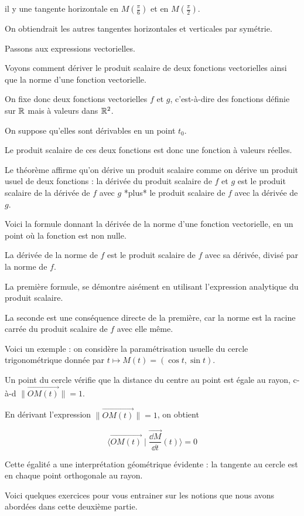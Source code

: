 \change
il y une tangente horizontale en $M(\frac\pi6)$ 
et en $M(\frac\pi2)$.

On obtiendrait les autres tangentes horizontales et verticales par symétrie.


\diapo

Passons aux expressions vectorielles.

Voyons comment dériver le produit scalaire de deux fonctions vectorielles ainsi
que la norme d'une fonction vectorielle.

On fixe donc deux fonctions vectorielles $f$ et $g$, c'est-à-dire des fonctions définie sur $\mathbb{R}$
mais à valeurs dans $\mathbb{R}^2$.

On suppose qu'elles sont dérivables en un point $t_0$.

\change

Le produit scalaire de ces deux fonctions est donc une fonction à valeurs 
réelles.

Le théorème affirme qu'on dérive un produit scalaire 
comme on dérive un produit usuel de deux fonctions : 
la dérivée du produit scalaire de $f$ et $g$ est le 
produit scalaire de la dérivée de $f$ avec  $g$ *plus* le produit 
scalaire de $f$ avec la dérivée de $g$. 

\change

Voici la formule donnant la dérivée de la norme d'une fonction vectorielle, 
en un point où la fonction est non nulle.

La dérivée de la norme de $f$ est le produit scalaire de $f$ avec 
sa dérivée, divisé par la norme de $f$.


La première formule, se démontre aisément 
en utilisant l'expression analytique du produit scalaire.

La seconde  est une conséquence directe de la première, 
car la norme est la racine carrée du produit scalaire de $f$ avec 
elle même.

\diapo

Voici un exemple : on considère la paramétrisation usuelle 
du cercle trigonométrique donnée par $t\mapsto M(t)=(\cos t,\sin t)$. 

\change
Un point du cercle vérifie que la distance du centre au point est égale au rayon,
c-à-d $\|\overrightarrow{OM(t)}\|=1$.

\change

En dérivant l'expression $\|\overrightarrow{OM(t)}\|=1$, on obtient

$$\big\langle \overrightarrow{OM(t)} \mid \overrightarrow{\frac{\dd M}{\dd t}}(t) \big\rangle =0$$


\change

Cette égalité a une interprétation géométrique évidente : 
la tangente au cercle est en chaque point orthogonale au rayon.

\diapo

Voici quelques exercices pour vous entrainer sur les notions que nous avons abordées dans cette deuxième partie.



